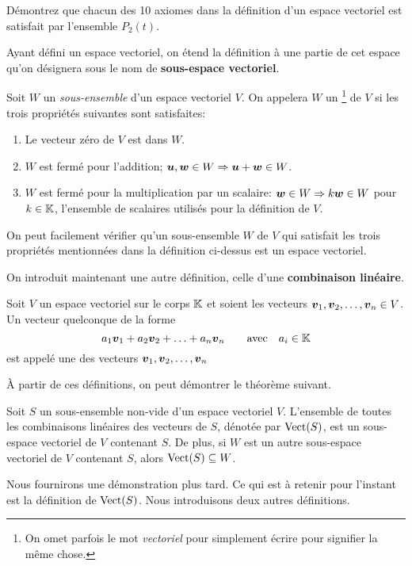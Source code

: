 \begin{exerciceC}
Démontrez que chacun des 10 axiomes dans la définition d'un espace vectoriel est satisfait
par l'ensemble $P_2(t)$.
\end{exerciceC}

Ayant défini un espace vectoriel, on étend la définition à une partie de cet espace
qu'on désignera sous le nom de \textbf{sous-espace vectoriel}.

\begin{defini}
Soit $W$ un \textit{sous-ensemble} d'un espace vectoriel $V$.  
On appelera $W$ un \footnote{On omet parfois le mot \textit{vectoriel}
pour simplement écrire  pour signifier la même chose.} de $V$ si
les trois propriétés suivantes sont satisfaites:
\begin{enumerate}
\item Le vecteur zéro de $V$ est dans $W$.
\item $W$ est fermé pour l'addition; $\boldsymbol{u}, \boldsymbol{w} \in W \Rightarrow \boldsymbol{u} + \boldsymbol{w} \in W$.
\item $W$ est fermé pour la multiplication par un scalaire: $\boldsymbol{w}\in W \Rightarrow k\boldsymbol{w}\in W$ pour $k\in \mathbb{K}$,
l'ensemble de scalaires utilisés pour la définition de $V$.
\end{enumerate}
\end{defini}
On peut facilement vérifier qu'un sous-ensemble $W$ de $V$ qui satisfait les trois propriétés mentionnées dans la définition ci-dessus est un espace vectoriel.

On introduit maintenant une autre définition, celle d'une \textbf{combinaison linéaire}.
\begin{defini}
Soit $V$ un espace vectoriel sur le corps $\mathbb{K}$ et soient les vecteurs $\boldsymbol{v}_1,\boldsymbol{v}_2, \ldots, \boldsymbol{v}_n \in V$.
Un vecteur quelconque de la forme 
\[
a_1 \boldsymbol{v}_1 + a_2 \boldsymbol{v}_2 + \ldots + a_n \boldsymbol{v}_n \qquad \mbox{avec} \quad a_i \in \mathbb{K}
\]
est appelé une  des vecteurs $\boldsymbol{v}_1,\boldsymbol{v}_2, \ldots, \boldsymbol{v}_n$
\end{defini}

À partir de ces définitions, on peut démontrer le théorème suivant.
\begin{theo}
Soit $S$ un sous-ensemble non-vide d'un espace vectoriel $V$.  L'ensemble de toutes les combinaisons linéaires
des vecteurs de $S$, dénotée par $\operatorname{Vect}(S)$, est un sous-espace vectoriel de $V$ contenant $S$.  De plus, si
$W$ est un autre sous-espace vectoriel de $V$ contenant $S$, alors $\operatorname{Vect}(S)\subseteq W$.
\end{theo}
Nous fournirons une démonstration plus tard.   Ce qui est à retenir pour l'instant est la définition de $\operatorname{Vect}(S)$.
Nous introduisons deux autres définitions.

